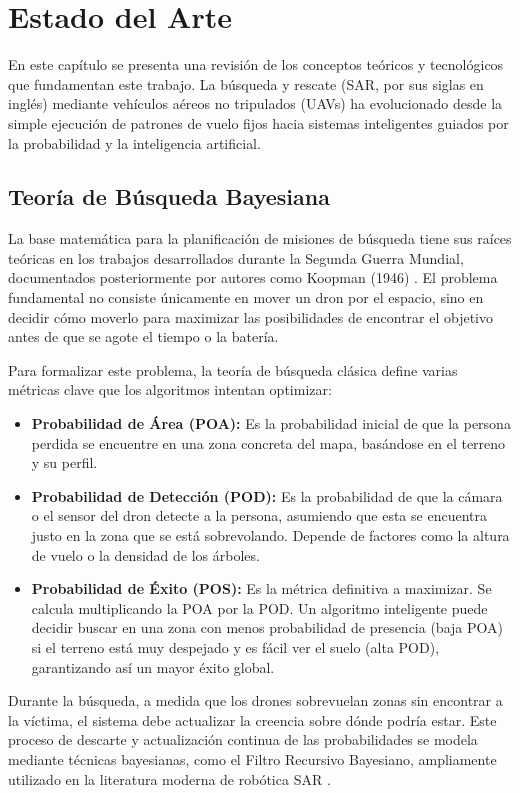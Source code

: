 \chapter{Estado del Arte}

En este capítulo se presenta una revisión de los conceptos teóricos y tecnológicos que fundamentan este trabajo. La búsqueda y rescate (SAR, por sus siglas en inglés) mediante vehículos aéreos no tripulados (UAVs) ha evolucionado desde la simple ejecución de patrones de vuelo fijos hacia sistemas inteligentes guiados por la probabilidad y la inteligencia artificial.

\section{Teoría de Búsqueda Bayesiana}

La base matemática para la planificación de misiones de búsqueda tiene sus raíces teóricas en los trabajos desarrollados durante la Segunda Guerra Mundial, documentados posteriormente por autores como Koopman (1946) \cite{koopman}. El problema fundamental no consiste únicamente en mover un dron por el espacio, sino en decidir cómo moverlo para maximizar las posibilidades de encontrar el objetivo antes de que se agote el tiempo o la batería.

Para formalizar este problema, la teoría de búsqueda clásica define varias métricas clave que los algoritmos intentan optimizar:
\begin{itemize}
    \item \textbf{Probabilidad de Área (POA):} Es la probabilidad inicial de que la persona perdida se encuentre en una zona concreta del mapa, basándose en el terreno y su perfil.
    \item \textbf{Probabilidad de Detección (POD):} Es la probabilidad de que la cámara o el sensor del dron detecte a la persona, asumiendo que esta se encuentra justo en la zona que se está sobrevolando. Depende de factores como la altura de vuelo o la densidad de los árboles.
    \item \textbf{Probabilidad de Éxito (POS):} Es la métrica definitiva a maximizar. Se calcula multiplicando la POA por la POD. Un algoritmo inteligente puede decidir buscar en una zona con menos probabilidad de presencia (baja POA) si el terreno está muy despejado y es fácil ver el suelo (alta POD), garantizando así un mayor éxito global.
\end{itemize}

Durante la búsqueda, a medida que los drones sobrevuelan zonas sin encontrar a la víctima, el sistema debe actualizar la creencia sobre dónde podría estar. Este proceso de descarte y actualización continua de las probabilidades se modela mediante técnicas bayesianas, como el Filtro Recursivo Bayesiano, ampliamente utilizado en la literatura moderna de robótica SAR \cite{MTS_c1, lanillos-bayesian}.


